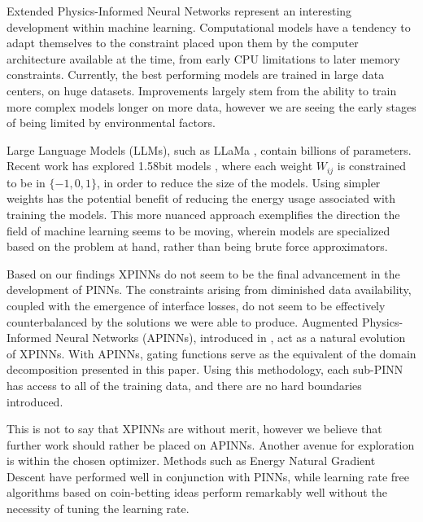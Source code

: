 Extended Physics-Informed Neural Networks represent an interesting development within machine learning.
Computational models have a tendency to adapt themselves to the constraint placed upon them by the computer architecture available at the time, from early CPU limitations to later memory constraints.
Currently, the best performing models are trained in large data centers, on huge datasets.
Improvements largely stem from the ability to train more complex models longer on more data, however we are seeing the early stages of being limited by environmental factors.

Large Language Models (LLMs), such as LLaMa \cite{touvron2023llama}, contain billions of parameters.
Recent work has explored 1.58bit models \cite{ma2024era}, where each weight $W_{ij}$ is constrained to be in $\{-1, 0, 1\}$, in order to reduce the size of the models.
Using simpler weights has the potential benefit of reducing the energy usage associated with training the models.
This more nuanced approach exemplifies the direction the field of machine learning seems to be moving, wherein models are specialized based on the problem at hand, rather than being brute force approximators.

Based on our findings XPINNs do not seem to be the final advancement in the development of PINNs.
The constraints arising from diminished data availability, coupled with the emergence of interface losses, do not seem to be effectively counterbalanced by the solutions we were able to produce.
Augmented Physics-Informed Neural Networks (APINNs), introduced in \textcite{Hu_2023}, act as a natural evolution of XPINNs.
With APINNs, gating functions serve as the equivalent of the domain decomposition presented in this paper.
Using this methodology, each sub-PINN has access to all of the training data, and there are no hard boundaries introduced.

This is not to say that XPINNs are without merit, however we believe that further work should rather be placed on APINNs.
Another avenue for exploration is within the chosen optimizer.
Methods such as Energy Natural Gradient Descent \cite{müller2023achieving} have performed well in conjunction with PINNs, while learning rate free algorithms based on coin-betting ideas \cite{sharrock2023learning} perform remarkably well without the necessity of tuning the learning rate.
